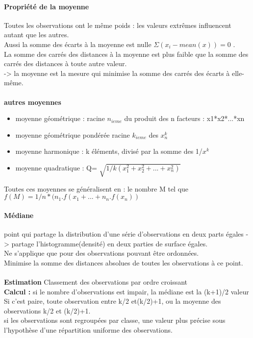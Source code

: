 \documentclass{article}
\begin{document}
\paragraph{Propriété de la moyenne}
Toutes les observations ont le même poids : les valeurs extrêmes influencent autant que les autres.\\Aussi la somme des écarts à la moyenne est nulle $\Sigma(x_{i} - mean(x)) = 0$ .\\ La somme des carrés des distances à la moyenne est plus faible que la somme des carrés des distances à toute autre valeur.\\-> la moyenne est la mesure qui minimise la somme des carrés des écarts à elle-même.\\\\\textbf{autres moyennes}\begin{itemize}
\item moyenne géométrique : racine $n_{ieme}$ du produit des n facteurs : x1*x2*...*xn
\item moyenne géométrique pondérée racine $k_{ieme}$ des $x_{n}^{k}$
\item moyenne harmonique : k éléments, divisé par la somme des 1/$x^{k}$
\item moyenne quadratique : Q= $\sqrt{1/k(x_{1}^{2}+x_{2}^{2}+...+x_{n}^{2})}$
\end{itemize}
Toutes ces moyennes se généralisent en : le nombre M tel que \\$f(M) = 1/n*(n_{1}.f(x_{1}+...+n_{n}.f(x_{n}))$
\paragraph{Médiane} 
point qui partage la distribution d'une série d'observations en deux parts égales -> partage l'histogramme(densité) en deux parties de surface égales.\\ Ne s'applique que pour des observations pouvant être ordonnées.\\ Minimise la somme des distances absolues de toutes les observations à ce point. \\\\\textbf{Estimation} Classement des observations par ordre croissant\\\textbf{Calcul : }si le nombre d'observations est impair, la médiane est la (k+1)/2 valeur\\Si c'est paire, toute observation entre k/2 et(k/2)+1, ou la moyenne des observations k/2 et (k/2)+1.\\ si les observations sont regroupées par classe, une valeur plus précise sous l'hypothèse d'une répartition uniforme des observations.
\end{document}
